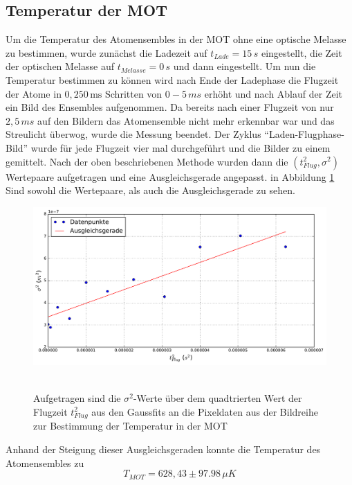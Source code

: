 \documentclass[twoside,colorback,accentcolor=tud4c,11pt]{tudreport}
\begin{document}
\subsection{Temperatur der MOT}\label{subsec:tempMOT}
Um die Temperatur des Atomensembles in der MOT ohne eine optische Melasse zu bestimmen, wurde zunächst die Ladezeit auf $t_{Lade}=15\,\si{s}$ eingestellt, die Zeit der optischen Melasse auf $t_{Melasse}=0\,\si{s}$ und dann eingestellt. Um nun die Temperatur bestimmen zu können wird nach Ende der Ladephase die Flugzeit der Atome in $0,250\,\si{\ms}$ Schritten von $0-5\,\si{ms}$ erhöht und nach Ablauf der Zeit ein Bild des Ensembles aufgenommen. Da bereits nach einer Flugzeit von nur $2,5\,\si{ms}$ auf den Bildern das Atomensemble nicht mehr erkennbar war und das Streulicht überwog, wurde die Messung beendet. Der Zyklus "`Laden-Flugphase-Bild"' wurde für jede Flugzeit vier mal durchgeführt und die Bilder zu einem gemittelt. Nach der oben beschriebenen Methode wurden dann die $(t_{Flug}^2,\sigma^2)$ Wertepaare aufgetragen und eine Ausgleichsgerade angepasst. in Abbildung \ref{tmot} Sind sowohl die Wertepaare, als auch die Ausgleichsgerade zu sehen.
\begin{figure}[H]
\centering
   	\begin{minipage}[b]{0.85\textwidth}
   	\includegraphics[width=\textwidth]{graphics/tempmot.pdf}\
   	\end{minipage}
\caption{Aufgetragen sind die $\sigma^2$-Werte über dem quadtrierten Wert der Flugzeit $t_{Flug}^2$ aus den Gaussfits an die Pixeldaten aus der Bildreihe zur Bestimmung der Temperatur in der MOT}\label{tmot}	
\end{figure}
Anhand der Steigung dieser Ausgleichsgeraden konnte die Temperatur des Atomensembles zu 
\begin{equation}\label{eq:tempMOT}
T_{MOT}=628,43\pm 97.98\,\si{\mu K}
\end{equation}
\end{document}
